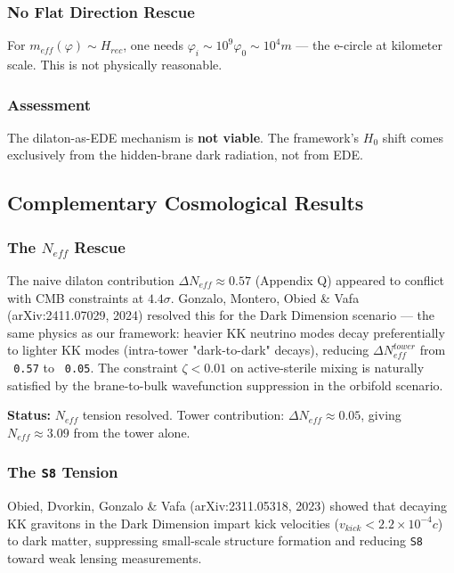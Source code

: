 \documentclass[aps,prd,preprint,superscriptaddress,longbibliography,floatfix]{revtex4-2}
\theoremstyle{remark}
\begin{document}
\subsubsection{No Flat Direction Rescue}

For $m_{eff}(\varphi) \sim  H_{rec}$, one needs $\varphi_i \sim  10^{9} \varphi_{0} \sim  10^{4} m$ --- the e-circle at kilometer scale. This is not physically reasonable.


\subsubsection{Assessment}

The dilaton-as-EDE mechanism is \textbf{not viable}. The framework's $H_{0}$ shift comes exclusively from the hidden-brane dark radiation, not from EDE.



\subsection{Complementary Cosmological Results}


\subsubsection{The $N_{eff}$ Rescue \cite{GonzaloNeutrinoTowers2024}}

The naive dilaton contribution $\Delta N_{eff} \approx 0.57$ (Appendix Q) appeared to conflict with CMB constraints at $4.4\sigma$. Gonzalo, Montero, Obied \& Vafa (arXiv:2411.07029, 2024) resolved this for the Dark Dimension scenario --- the same physics as our framework: heavier KK neutrino modes decay preferentially to lighter KK modes (intra-tower "dark-to-dark" decays), reducing $\Delta N_{eff}^{tower}$ from \texttt{~0.57} to \texttt{~0.05}. The constraint $\zeta < 0.01$ on active-sterile mixing is naturally satisfied by the brane-to-bulk wavefunction suppression in the orbifold scenario.

\textbf{Status:} $N_{eff}$ tension resolved. Tower contribution: $\Delta N_{eff} \approx 0.05$, giving $N_{eff} \approx 3.09$ from the tower alone.


\subsubsection{The \texttt{S8} Tension \cite{ObiedDarkDimensionS82023}}

Obied, Dvorkin, Gonzalo \& Vafa (arXiv:2311.05318, 2023) showed that decaying KK gravitons in the Dark Dimension impart kick velocities ($v_{kick} < 2.2 \times 10^{-4} c$) to dark matter, suppressing small-scale structure formation and reducing \texttt{S8} toward weak lensing measurements.
\end{document}
